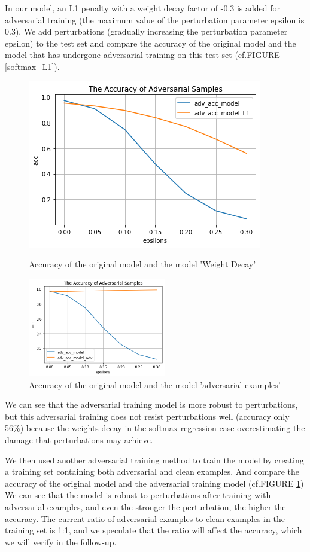 In our model, an L1 penalty with a weight decay factor of -0.3 is added for adversarial training (the maximum value of the perturbation parameter epsilon is 0.3). We add perturbations (gradually increasing the perturbation parameter epsilon) to the test set and compare the accuracy of the original model and the model that has undergone adversarial training on this test set (cf.FIGURE \ref{softmax_L1}). 
\begin{figure}[htb]
\centering
\begin{minipage}[t]{0.48\textwidth}
\centering
\includegraphics[width=6 cm]{softmax_modelL1.png}
\caption{Accuracy of the original model and the model 'Weight Decay'}
\label{softmax_L1}
\end{minipage}
\begin{minipage}[t]{0.48\textwidth}
\centering
\includegraphics[width=6cm]{softmax_model_adv_ex.png}
\caption{Accuracy of the original model and the model 'adversarial examples'}
\label{softmax_adv}
\end{minipage}
\end{figure}
We can see that the adversarial training model is more robust to perturbations, but this adversarial training does not resist perturbations well (accuracy only 56\%) because the weights decay in the softmax regression case overestimating the damage that perturbations may achieve.

We then used another adversarial training method to train the model by creating a training set containing both adversarial and clean examples. And compare the accuracy of the original model and the adversarial training model (cf.FIGURE \ref{softmax_adv}) We can see that the model is robust to perturbations after training with adversarial examples, and even the stronger the perturbation, the higher the accuracy. The current ratio of adversarial examples to clean examples in the training set is 1:1, and we speculate that the ratio will affect the accuracy, which we will verify in the follow-up.\\

